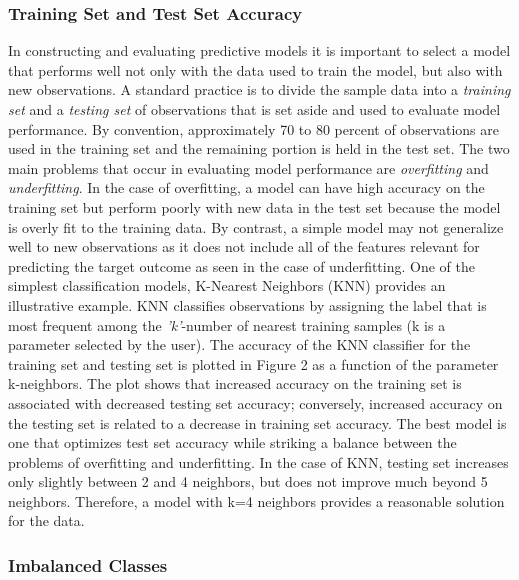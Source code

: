 \documentclass[sigconf]{acmart}
\begin{document}

\subsubsection{Training Set and Test Set Accuracy}

In constructing and evaluating predictive models it is important to select 
a model that performs well not only with the data used to train the model, 
but also with new observations. A standard practice is to divide the sample 
data into a \emph{training set} and a \emph{testing set} of observations 
that is set aside and used to evaluate model performance. By convention, 
approximately 70 to 80 percent of observations are used in the training set 
and the remaining portion is held in the test set. The two main problems 
that occur in evaluating model performance are \emph{overfitting} and 
\emph{underfitting}. In the case of overfitting, a model can have high 
accuracy on the training set but perform poorly with new data in the test set 
because the model is overly fit to the training data. By contrast, a 
simple model may not generalize well to new observations as it does not
include all of the features relevant for predicting the target outcome 
as seen in the case of underfitting. One of the simplest classification 
models, K-Nearest Neighbors (KNN) provides an illustrative example. KNN 
classifies observations by assigning the label that is most frequent among 
the \textit{'k'}-number of nearest training samples (k is a parameter 
selected by the user). The accuracy of the KNN classifier for the training 
set and testing set is plotted in Figure 2 as a function of the parameter 
k-neighbors. The plot shows that increased accuracy on the training set is 
associated with decreased testing set accuracy; conversely, increased 
accuracy on the testing set is related to a decrease in training set 
accuracy. The best model is one that optimizes test set accuracy while 
striking a balance between the problems of overfitting and underfitting. 
In the case of KNN, testing set increases only slightly between 2 and 4 
neighbors, but does not improve much beyond 5 neighbors. Therefore, a model 
with k=4 neighbors provides a reasonable solution for the data. 

\subsubsection{Imbalanced Classes}
\end{document}
